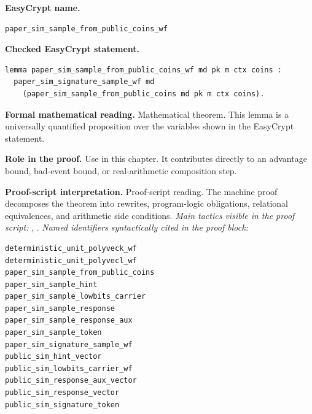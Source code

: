 \begin{formaltheorem}
\noindent\textbf{EasyCrypt name.}
\begin{lstlisting}[language=EasyCrypt,basicstyle=\ttfamily\scriptsize]
paper_sim_sample_from_public_coins_wf
\end{lstlisting}
\noindent\textbf{Checked EasyCrypt statement.}
\begin{lstlisting}[language=EasyCrypt,basicstyle=\ttfamily\scriptsize]
lemma paper_sim_sample_from_public_coins_wf md pk m ctx coins :
  paper_sim_signature_sample_wf md
    (paper_sim_sample_from_public_coins md pk m ctx coins).
\end{lstlisting}
\noindent\textbf{Formal mathematical reading.}
Mathematical theorem. This lemma is a universally quantified proposition over the variables shown in the EasyCrypt statement.

\noindent\textbf{Role in the proof.}
Use in this chapter. It contributes directly to an advantage bound, bad-event bound, or real-arithmetic composition step.

\noindent\textbf{Proof-script interpretation.}
Proof-script reading. The machine proof decomposes the theorem into rewrites, program-logic obligations, relational equivalences, and arithmetic side conditions.
\emph{Main tactics visible in the proof script:} , .
\emph{Named identifiers syntactically cited in the proof block:}
\begin{lstlisting}[language=EasyCrypt,basicstyle=\ttfamily\scriptsize]
deterministic_unit_polyveck_wf
deterministic_unit_polyvecl_wf
paper_sim_sample_from_public_coins
paper_sim_sample_hint
paper_sim_sample_lowbits_carrier
paper_sim_sample_response
paper_sim_sample_response_aux
paper_sim_sample_token
paper_sim_signature_sample_wf
public_sim_hint_vector
public_sim_lowbits_carrier_wf
public_sim_response_aux_vector
public_sim_response_vector
public_sim_signature_token
\end{lstlisting}

\end{formaltheorem}

